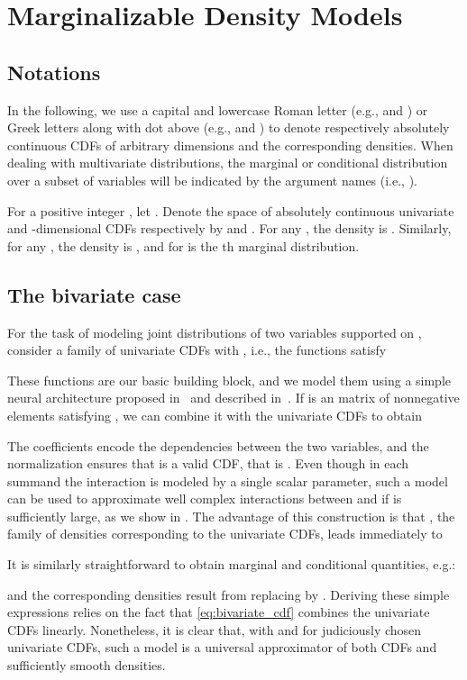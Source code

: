 \documentclass{article}
\begin{document}
 

\section{Marginalizable Density Models}
\label{sec:marginalizable_models}

\subsection{Notations}
In the following, we use a capital and lowercase Roman letter (e.g.,  and ) or Greek letters along with dot above (e.g.,  and ) to denote respectively absolutely continuous CDFs of arbitrary dimensions and the corresponding densities. When dealing with multivariate distributions, the marginal or conditional distribution over a subset of variables will be indicated by the argument names (i.e., ).

For a positive integer , 
let .
Denote the space of absolutely continuous univariate and -dimensional CDFs respectively by  and . 
For any , the density  is .
Similarly, for any , the density  is ,
and  for  is the th marginal distribution.


\subsection{The bivariate case}
For the task of modeling joint distributions of two variables supported on ,
consider a family of univariate CDFs
 with , i.e., the functions 
 satisfy

These functions are our basic building block, 
and we model them using a simple neural architecture proposed in~\cite{balle2018variational} and described in~. 
If  is an  matrix of nonnegative elements satisfying ,
we can combine it with the univariate CDFs to obtain

The coefficients  encode the dependencies between the two variables, and the normalization ensures that  is a valid CDF, that is .
Even though in each summand the interaction is modeled by a single scalar parameter, such a model can be used to approximate well complex interactions between  and  if  is sufficiently large, as we show in . 
The advantage of this construction is that , the family of densities corresponding to the univariate CDFs, leads immediately to 

It is similarly straightforward to obtain marginal and conditional quantities, e.g.:

and the corresponding densities result from replacing  by .
Deriving these simple expressions 
relies on the fact that \eqref{eq:bivariate_cdf} combines the univariate CDFs linearly. Nonetheless, it is clear that, with  and for judiciously chosen univariate CDFs, such a model is a universal approximator of both CDFs and sufficiently smooth densities.
\end{document}
